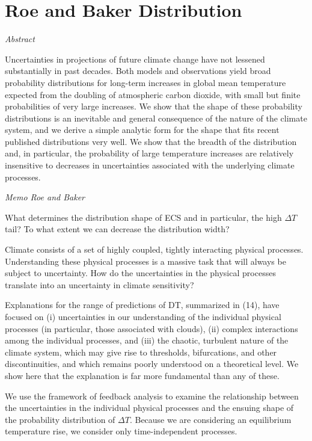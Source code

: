 \documentclass[
]{book}
\begin{document}
\hypertarget{roe-and-baker-distribution}{%
\section{Roe and Baker Distribution}\label{roe-and-baker-distribution}}

\emph{Abstract}

Uncertainties in projections of future climate change have not lessened substantially in past
decades. Both models and observations yield broad probability distributions for long-term
increases in global mean temperature expected from the doubling of atmospheric carbon dioxide,
with small but finite probabilities of very large increases. We show that the shape of these
probability distributions is an inevitable and general consequence of the nature of the climate
system, and we derive a simple analytic form for the shape that fits recent published distributions
very well. We show that the breadth of the distribution and, in particular, the probability of
large temperature increases are relatively insensitive to decreases in uncertainties associated with
the underlying climate processes.

\emph{Memo Roe and Baker}

What determines the distribution shape of ECS and in particular, the high \(\Delta T\) tail?
To what extent we can decrease the distribution width?

Climate consists of a set of highly coupled, tightly interacting physical processes.
Understanding these physical processes is a massive
task that will always be subject to uncertainty.
How do the uncertainties in the physical processes translate into an uncertainty in climate
sensitivity?

Explanations for the range of
predictions of DT, summarized in (14), have
focused on
(i) uncertainties in our understanding of the individual physical processes
(in particular, those associated with clouds),
(ii) complex interactions among the individual processes, and
(iii) the chaotic, turbulent nature of the climate system, which may give rise to
thresholds, bifurcations, and other discontinuities, and which
remains poorly understood on a theoretical level.
We show here that the explanation is far more fundamental than any of these.

We use the framework of feedback analysis to examine the relationship between the
uncertainties in the individual physical processes and the ensuing shape of
the probability distribution of \(\Delta T\).
Because we are considering an equilibrium temperature rise, we consider only
time-independent processes.
\end{document}
